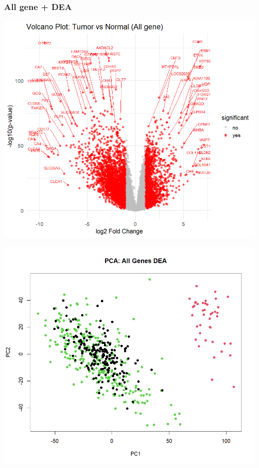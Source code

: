 \documentclass[12pt, aspectratio=43]{beamer}
\begin{document}
	\begin{frame}
		\frametitle{All gene + DEA}
	
			\begin{minipage}[t]{0.50\textwidth} 
				\centering
				\label{fig:gene-a}
				\vspace{0.5em}
				\includegraphics[width=\linewidth]{volcano_dea.png}
	
			\end{minipage}
			\begin{minipage}[t]{0.50\textwidth} 
				\centering
				
				\label{fig:gene-a}
				\vspace{0.5em}
				\includegraphics[width=\linewidth]{dea_pca_allgene.png}			
			\end{minipage}%
	
	\end{frame}
	
\end{document}
